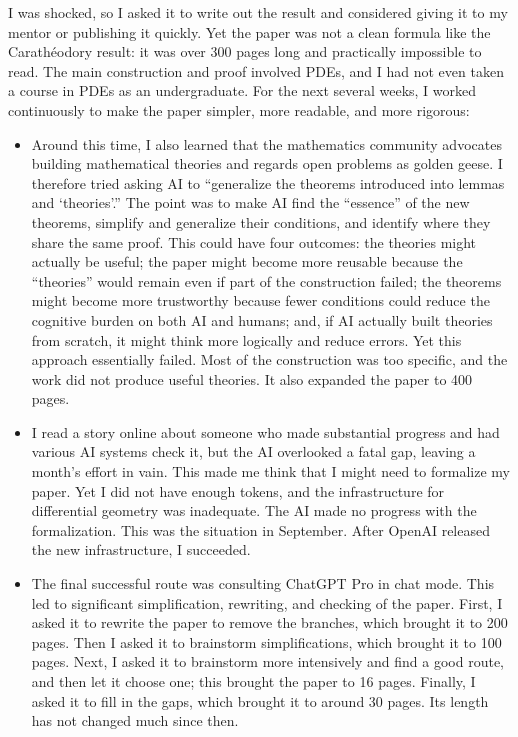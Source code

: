 I was shocked, so I asked it to write out the result and considered
giving it to my mentor or publishing it quickly. Yet the paper was not
a clean formula like the Carath\'eodory result: it was over 300 pages
long and practically impossible to read. The main construction and
proof involved PDEs, and I had not even taken a course in PDEs as an
undergraduate. For the next several weeks, I worked continuously to
make the paper simpler, more readable, and more rigorous:
\begin{itemize}
\item Around this time, I also learned that the mathematics community
advocates building mathematical theories and regards open problems as
golden geese. I therefore tried asking AI to ``generalize the theorems
introduced into lemmas and `theories'.'' The point was to make AI find
the ``essence'' of the new theorems, simplify and generalize their
conditions, and identify where they share the same proof. This could
have four outcomes: the theories might actually be useful; the paper
might become more reusable because the ``theories'' would remain even
if part of the construction failed; the theorems might become more
trustworthy because fewer conditions could reduce the cognitive burden
on both AI and humans; and, if AI actually built theories from scratch,
it might think more logically and reduce errors. Yet this approach
essentially failed. Most of the construction was too specific, and
the work did not produce useful theories. It also expanded the paper
to 400 pages.
\item I read a story online about someone who made substantial progress
and had various AI systems check it, but the AI overlooked a fatal gap,
leaving a month's effort in vain. This made me think that I might need
to formalize my paper. Yet I did not have enough tokens, and the
infrastructure for differential geometry was inadequate. The AI made
no progress with the formalization. This was the situation in September.
After OpenAI released the new infrastructure, I succeeded.
\item The final successful route was consulting ChatGPT Pro in chat
mode. This led to significant simplification, rewriting, and checking
of the paper. First, I asked it to rewrite the paper to remove the
branches, which brought it to 200 pages. Then I asked it to brainstorm
simplifications, which brought it to 100 pages. Next, I asked it to
brainstorm more intensively and find a good route, and then let it
choose one; this brought the paper to 16 pages. Finally, I asked it
to fill in the gaps, which brought it to around 30 pages. Its length
has not changed much since then.
\end{itemize}


